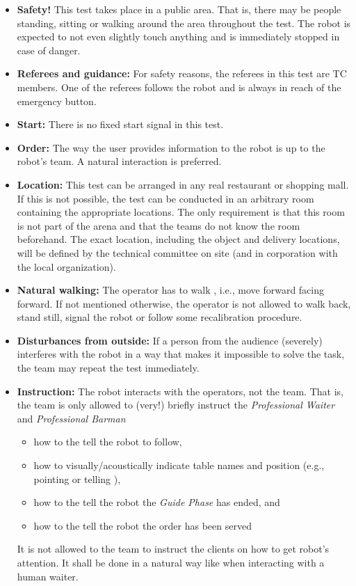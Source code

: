 \begin{itemize}
	\item \textbf{Safety!} This test takes place in a public area. That is, there may be people standing, sitting or walking around the area throughout the test. The robot is expected to not even slightly touch anything and is immediately stopped in case of danger.

	\item \textbf{Referees and guidance:} For safety reasons, the referees in this test are TC members. One of the referees follows the robot and is always in reach of the emergency button.

	\item \textbf{Start:} There is no fixed start signal in this test.

	\item \textbf{Order:} The way the user provides information to the robot is up to the robot's team. A natural interaction is preferred.

	\item \textbf{Location:} This test can be arranged in any real restaurant or shopping mall. If this is not possible, the test can be conducted in an arbitrary room containing the appropriate locations. The only requirement is that this room is not part of the arena and that the teams do not know the room beforehand. The exact location, including the object and delivery locations, will be defined by the technical committee on site (and in corporation with the local organization).

	\item \textbf{Natural walking:} The operator has to walk , i.e., move forward facing forward. If not mentioned otherwise, the operator is not allowed to walk back, stand still, signal the robot or follow some recalibration procedure.

	\item \textbf{Disturbances from outside:} If a person from the audience (severely) interferes with the robot in a way that makes it impossible to solve the task, the team may repeat the test immediately.

	\item \textbf{Instruction:} The robot interacts with the operators, not the team. That is, the team is only allowed to (very!) briefly instruct the \textit{Professional Waiter} and \textit{Professional Barman} 
	\begin{itemize}
		\item how to the tell the robot to follow,
		\item how to visually/acoustically indicate table names and position (e.g., pointing or telling ), 
		\item how to the tell the robot the \textit{Guide Phase} has ended, and
		\item how to the tell the robot the order has been served
	\end{itemize}
	It is not allowed to the team to instruct the clients on how to get robot's attention. It shall be done in a natural way like when interacting with a human waiter.


\end{itemize}
